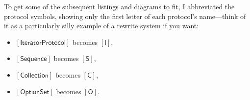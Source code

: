 \documentclass[a4paper,headsepline,bibliography=totoc,toc=flat,fleqn,twoside=semi]{scrbook}
\theoremstyle{definition}
\theoremstyle{definition}
\theoremstyle{definition}
\newcommand{\proto}[1]{\bm{\mathsf{#1}}}
\newcommand{\protosym}[1]{[\proto{#1}]}
\begin{document}

To get some of the subsequent listings and diagrams to fit, I abbreviated the protocol symbols, showing only the first letter of each protocol's name---think of it as a particularly silly example of a rewrite system if you want:
\begin{itemize}
\item $\protosym{IteratorProtocol}$ becomes $\protosym{I}$, 
\item $\protosym{Sequence}$ becomes $\protosym{S}$, 
\item $\protosym{Collection}$ becomes $\protosym{C}$,
\item $\protosym{OptionSet}$ becomes $\protosym{O}$.
\end{itemize}
\end{document}
